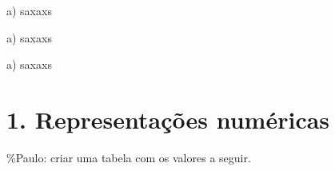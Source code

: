 
a) saxaxs


a) saxaxs

a) saxaxs

\hypertarget{representauxe7uxf5es-numuxe9ricas}{%
\section{1. Representações
numéricas}\label{representauxe7uxf5es-numuxe9ricas}}


\%Paulo: criar uma tabela com os valores a seguir.
